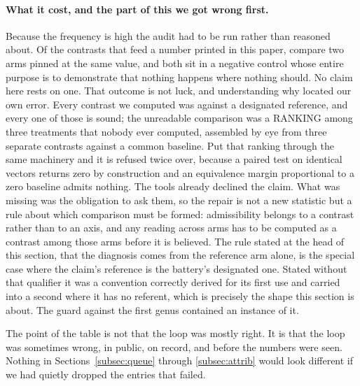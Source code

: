 \documentclass[11pt]{article}
\begin{document}
\paragraph{What it cost, and the part of this we got wrong first.} Because the frequency is high the audit had to be run rather than reasoned about. Of the \PnContrasts{} contrasts that feed a number printed in this paper, \PnCost{} compare two arms pinned at the same value, and both sit in a negative control whose entire purpose is to demonstrate that nothing happens where nothing should. No claim here rests on one. That outcome is not luck, and understanding why located our own error. Every contrast we computed was against a designated reference, and every one of those is sound; the unreadable comparison was a RANKING among three treatments that nobody ever computed, assembled by eye from three separate contrasts against a common baseline. Put that ranking through the same machinery and it is refused twice over, because a paired test on identical vectors returns zero by construction and an equivalence margin proportional to a zero baseline admits nothing. The tools already declined the claim. What was missing was the obligation to ask them, so the repair is not a new statistic but a rule about which comparison must be formed: admissibility belongs to a contrast rather than to an axis, and any reading across arms has to be computed as a contrast among those arms before it is believed. The rule stated at the head of this section, that the diagnosis comes from the reference arm alone, is the special case where the claim's reference is the battery's designated one. Stated without that qualifier it was a convention correctly derived for its first use and carried into a second where it has no referent, which is precisely the shape this section is about. The guard against the first genus contained an instance of it.

The point of the table is not that the loop was mostly right. It is that the loop was sometimes wrong, in public, on record, and before the numbers were seen. Nothing in Sections~\ref{subsec:queue} through \ref{subsec:attrib} would look different if we had quietly dropped the \ldFailed{} entries that failed.

\begin{table}[H]
\centering
\caption{Registered claims, the falsifier declared for each before its run, and what happened. Rows whose middle column reads ``instrument'' are measurement defects rather than claims, and each names the guard that now prevents its recurrence. Full text of every registration, including the ones not listed here, is in the repository's conjecture ledger.}
\label{tab:ledger}

\end{table}
\end{document}
